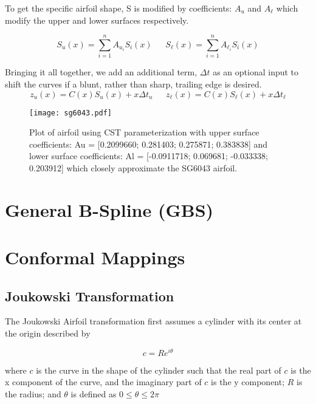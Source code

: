To get the specific airfoil shape, S is modified by coefficients: $A_u$ and $A_\ell$ which modify the upper and lower surfaces respectively.

\begin{equation}
S_{u}(x) = \sum_{i=1}^n A_{u_i} S_i(x)~~~~~~~
S_{\ell}(x) = \sum_{i=1}^n A_{\ell_i} S_i(x)
\end{equation}

Bringing it all together, we add an additional term, $\Delta t$ as an optional input to shift the curves if a blunt, rather than sharp, trailing edge is desired. %
\begin{equation}
z_u(x) = C(x) S_{u}(x) + x \Delta t_u ~~~~~~~ z_\ell(x) = C(x) S_{\ell}(x) + x \Delta t_\ell
\end{equation}

\begin{figure}[h!]
	\begin{center}
		\texttt{[image: sg6043.pdf]}
	\end{center}
	\caption{Plot of airfoil using CST parameterization with upper surface coefficients: Au = [0.2099660; 0.281403; 0.275871; 0.383838] and lower surface coefficients: Al = [-0.0911718; 0.069681; -0.033338; 0.203912] which closely approximate the SG6043 airfoil.}
	\label{fig:6043}
\end{figure}


\section{General B-Spline (GBS)}

\section{Conformal Mappings}

\subsection{Joukowski Transformation}
The Joukowski Airfoil transformation first assumes a cylinder with its center at the origin described by

\begin{equation}
\label{eqn:complexcircle}
	c = R e^{i\theta}
\end{equation}

where $c$ is the curve in the shape of the cylinder such that the real part of $c$ is the x component of the curve, and the imaginary part of $c$ is the y component; $R$ is the radius; and $\theta$ is defined as $0 \leq \theta \leq 2\pi$


